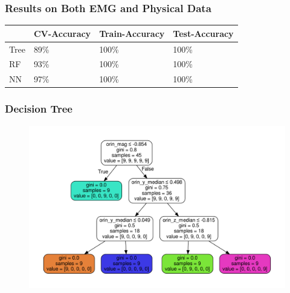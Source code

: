 \documentclass{beamer}
\begin{document}
\begin{frame}
\frametitle{Results on Both EMG and Physical Data}

\begin{tabular}{ |p{2cm}|p{2cm}||p{2cm}|p{2cm}|  }
 \hline
 &CV-Accuracy & Train-Accuracy & Test-Accuracy \\
 \hline
 Tree & 89\% & 100\%  & 100\% \\
 \hline
 RF & 93\%    & 100\%   & 100\% \\
 \hline
 NN & 97\%   & 100\%  & 100\% \\
 \hline
\end{tabular}

\end{frame}

\begin{frame}
\frametitle{Decision Tree}
\begin{figure}
\includegraphics[scale=.3]{tree}
\end{figure}
\end{frame}
\end{document}
